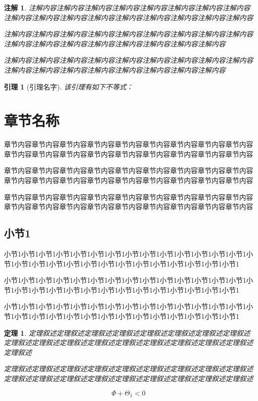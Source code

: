 \documentclass[a4paper, 12pt, oneside]{article}
\theoremstyle{cn_theorem}
\newtheorem{theorem}{定理}[section]
\newtheorem{lemma}{引理}[section]   %
\newtheorem{remark}{注解}[section]  %
\begin{document}
\begin{remark}
    注解内容注解内容注解内容注解内容注解内容注解内容注解内容注解内容注解内容注解内容注解内容注解内容注解内容注解内容注解内容注解内容注解内容

    注解内容注解内容注解内容注解内容注解内容注解内容注解内容注解内容注解内容注解内容注解内容注解内容注解内容注解内容注解内容注解内容注解内容

    注解内容注解内容注解内容注解内容注解内容注解内容注解内容注解内容注解内容注解内容注解内容注解内容注解内容注解内容注解内容注解内容注解内容
\end{remark}

\begin{lemma}[引理名字]
该引理有如下不等式：

\end{lemma}

\section{章节名称}
章节内容章节内容章节内容章节内容章节内容章节内容章节内容章节内容章节内容章节内容章节内容章节内容章节内容章节内容章节内容章节内容章节内容章节内容

章节内容章节内容章节内容章节内容章节内容章节内容章节内容章节内容章节内容章节内容章节内容章节内容章节内容章节内容章节内容章节内容章节内容章节内容

章节内容章节内容章节内容章节内容章节内容章节内容章节内容章节内容章节内容章节内容章节内容章节内容章节内容章节内容章节内容章节内容章节内容章节内容

\subsection{小节1}
小节1小节1小节1小节1小节1小节1小节1小节1小节1小节1小节1小节1小节1小节1小节1小节1小节1小节1小节1小节1小节1小节1小节1小节1小节1小节1小节1小节1

小节1小节1小节1小节1小节1小节1小节1小节1小节1小节1小节1小节1小节1小节1小节1小节1小节1小节1小节1小节1小节1小节1小节1小节1小节1小节1小节1小节1

小节1小节1小节1小节1小节1小节1小节1小节1小节1小节1小节1小节1小节1小节1小节1小节1小节1小节1小节1小节1小节1小节1小节1小节1小节1小节1小节1小节1

\begin{theorem} \label{main_theorem}
定理叙述定理叙述定理叙述定理叙述定理叙述定理叙述定理叙述定理叙述定理叙述定理叙述定理叙述定理叙述定理叙述定理叙述定理叙述定理叙述定理叙述定理叙述

定理叙述定理叙述定理叙述定理叙述定理叙述定理叙述定理叙述定理叙述定理叙述定理叙述定理叙述定理叙述定理叙述定理叙述定理叙述定理叙述定理叙述定理叙述

\begin{equation*}
    \Phi + \Theta_1 < 0
\end{equation*}

\end{theorem}
\end{document}
